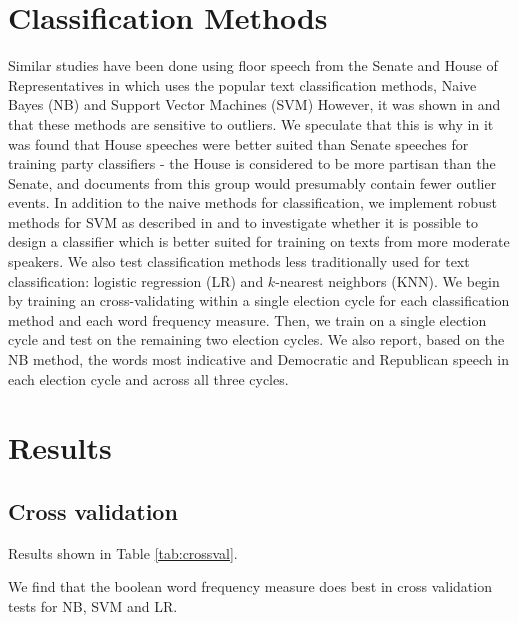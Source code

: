 \documentclass[aps, prl, reprint, showpacs]{revtex4-1}
\begin{document}
\section{Classification Methods}
Similar studies have been done using floor speech from the Senate and House of Representatives in \cite{yu} which uses the popular text classification methods, Naive Bayes (NB) and Support Vector Machines (SVM) However, it was shown in \cite{kwon} and \cite{thomas} that these methods are sensitive to outliers. We speculate that this is why in \cite{yu} it was found that House speeches were better suited than Senate speeches for training party classifiers - the House is considered to be more partisan than the Senate, and documents from this group would presumably contain fewer outlier events. In addition to the naive methods for classification, we implement robust methods for SVM  as described in \cite{chandra} and \cite{xu} to investigate whether it is possible to design a classifier which is better suited for training on texts from more moderate speakers. We also test classification methods less traditionally used for text classification: logistic regression (LR) and $k$-nearest neighbors (KNN). We begin by training an cross-validating within a single election cycle for each classification method and each word frequency measure.  Then, we train on a single election cycle and test on the remaining two election cycles. We also report, based on the NB method, the words most indicative and Democratic and Republican speech in each election cycle and across all three cycles.

\section{Results}

\subsection{Cross validation}

Results shown in Table \ref{tab:crossval}.

We find that the boolean word frequency measure does best in cross validation tests for NB, SVM and LR.
\end{document}
